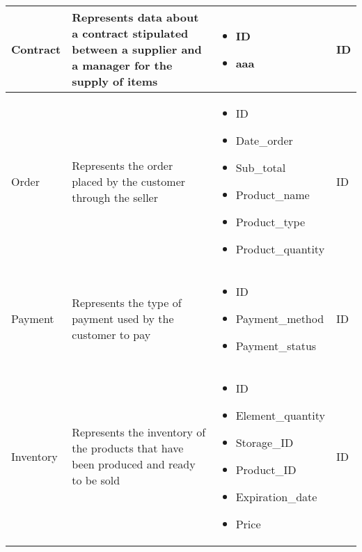 \begin{longtable}{|p{}|p{} |p{}|p{} |}
    Contract & Represents data about a contract stipulated between a supplier and a manager for the supply of items &
    \begin{itemize}
        \vspace{-1em}
        \item ID
        \item aaa   %
    \end{itemize}
    &  ID\\\hline

    Order & Represents the order placed by the customer through the seller &
    \begin{itemize}
        \vspace{-1em}
        \item ID
        \item Date\_order
        \item Sub\_total
        \item Product\_name
        \item Product\_type
        \item Product\_quantity
    \end{itemize}
    &  ID\\\hline

    Payment & Represents the type of payment used by the customer to pay &
    \begin{itemize}
        \vspace{-1em}
        \item ID
        \item Payment\_method
        \item Payment\_status
    \end{itemize}
    &  ID\\\hline

    Inventory & Represents the inventory of the products that have been produced and ready to be sold &
    \begin{itemize}
        \vspace{-1em}
        \item ID
        \item Element\_quantity
        \item Storage\_ID
        \item Product\_ID
        \item Expiration\_date
        \item Price     %
    \end{itemize}
    &  ID \\\hline


\end{longtable}
